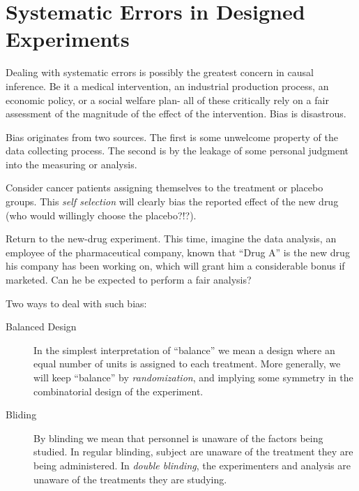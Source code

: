 \section{Systematic Errors in Designed Experiments}

Dealing with systematic errors is possibly the greatest concern in causal inference. 
Be it a medical intervention, an industrial production process, an economic policy, or a social welfare plan- all of these critically rely on a fair assessment of the magnitude of the effect of the intervention. Bias is disastrous. 

Bias originates from two sources.
The first is some unwelcome property of the data collecting process. 
The second is by the leakage of some personal judgment into the measuring or analysis. 

\begin{example}
	Consider cancer patients assigning themselves to the treatment or placebo groups. 
	This \emph{self selection} will clearly bias the reported effect of the new drug (who would willingly choose the placebo?!?). 
\end{example}


\begin{example}
	Return to the new-drug experiment. 
	This time, imagine the data analysis, an employee of the pharmaceutical company, known that ``Drug A'' is the new drug his company has been working on, which will grant him a considerable bonus if marketed. 
	Can he be expected to perform a fair analysis?
\end{example}

Two ways to deal with such bias:
\begin{description}
	\item [Balanced Design]
	In the simplest interpretation of ``balance'' we mean a design where an equal number of units is assigned to each treatment.
	More generally, we will keep ``balance'' by \emph{randomization}, and implying some symmetry in the combinatorial design of the experiment. 
	
	\item [Bliding]
	By blinding we mean that personnel is unaware of the factors being studied. 
	In regular blinding, subject are unaware of the treatment they are being administered. 
	In \emph{double blinding}, the experimenters and analysis are unaware of the treatments they are studying. 	 
	
\end{description}







